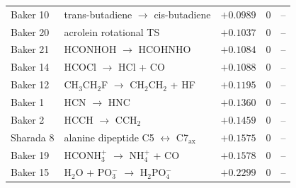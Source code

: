 \begin{table}[h]
\begin{tabular}{@{}llrcr@{}}
Baker 10  & trans-butadiene $\rightarrow$ cis-butadiene            & $+0.0989$ & 0 & -- \\
Baker 20  & acrolein rotational TS                                 & $+0.1037$ & 0 & -- \\
Baker 21  & HCONHOH $\rightarrow$ HCOHNHO                          & $+0.1084$ & 0 & -- \\
Baker 14  & HCOCl $\rightarrow$ HCl + CO                           & $+0.1088$ & 0 & -- \\
Baker 12  & CH$_3$CH$_2$F $\rightarrow$ CH$_2$CH$_2$ + HF           & $+0.1195$ & 0 & -- \\
Baker 1   & HCN $\rightarrow$ HNC                                  & $+0.1360$ & 0 & -- \\
Baker 2   & HCCH $\rightarrow$ CCH$_2$                             & $+0.1459$ & 0 & -- \\
Sharada 8 & alanine dipeptide C5 $\leftrightarrow$ C7$_\mathrm{ax}$ & $+0.1575$ & 0 & -- \\
Baker 19  & HCONH$_3^+$ $\rightarrow$ NH$_4^+$ + CO                & $+0.1578$ & 0 & -- \\
Baker 15  & H$_2$O + PO$_3^-$ $\rightarrow$ H$_2$PO$_4^-$          & $+0.2299$ & 0 & -- \\
\bottomrule
\end{tabular}
\end{table}
